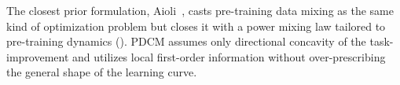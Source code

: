 The closest prior formulation, Aioli~\citep{chen2025aioli}, casts pre-training data mixing as the same kind of optimization problem but closes it with a power mixing law tailored to pre-training dynamics (). PDCM assumes only directional concavity of the task-improvement and utilizes local first-order information without over-prescribing the general shape of the learning curve.



